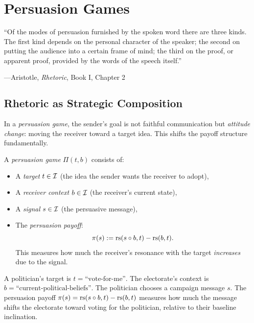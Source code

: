 \chapter{Persuasion Games}
\label{ch:persuasion}

\epigraph{``Of the modes of persuasion furnished by the spoken word there are
three kinds. The first kind depends on the personal character of the
speaker; the second on putting the audience into a certain frame of mind;
the third on the proof, or apparent proof, provided by the words of the
speech itself.''}
{---Aristotle, \emph{Rhetoric}, Book I, Chapter 2}


\section{Rhetoric as Strategic Composition}

In a \emph{persuasion game}, the sender's goal is not faithful communication
but \emph{attitude change}: moving the receiver toward a target idea. This
shifts the payoff structure fundamentally.

\begin{definition}
\label{def:persuasion-game}
A \emph{persuasion game} $\Pi(t, b)$ consists of:
\begin{itemize}
\item A \emph{target} $t \in \mathcal{I}$ (the idea the sender wants the receiver to adopt),
\item A \emph{receiver context} $b \in \mathcal{I}$ (the receiver's current state),
\item A \emph{signal} $s \in \mathcal{I}$ (the persuasive message),
\item The \emph{persuasion payoff}:
\[
\pi(s) := \mathrm{rs}(s \circ b, t) - \mathrm{rs}(b, t).
\]
This measures how much the receiver's resonance with the target \emph{increases}
due to the signal.
\end{itemize}
\end{definition}

\begin{game}
\label{game:political-debate}
A politician's target is $t = \text{``vote-for-me''}$. The electorate's
context is $b = \text{``current-political-beliefs''}$. The politician
chooses a campaign message $s$. The persuasion payoff $\pi(s) =
\mathrm{rs}(s \circ b, t) - \mathrm{rs}(b, t)$ measures how much the message shifts
the electorate toward voting for the politician, relative to their baseline
inclination.
\end{game}

